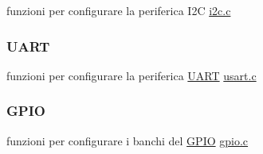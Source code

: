 \begin{DoxyItemize}
\item funzioni per configurare la periferica I2C \hyperlink{i2c_8c}{i2c.\+c} 
\end{DoxyItemize}\hypertarget{index_UART}{}\subsubsection{U\+A\+RT}\label{index_UART}

\begin{DoxyItemize}
\item funzioni per configurare la periferica \hyperlink{structUART}{U\+A\+RT} \hyperlink{usart_8c}{usart.\+c} 
\end{DoxyItemize}\hypertarget{index_GPIO}{}\subsubsection{G\+P\+IO}\label{index_GPIO}

\begin{DoxyItemize}
\item funzioni per configurare i banchi del \hyperlink{structGPIO}{G\+P\+IO} \hyperlink{gpio_8c}{gpio.\+c} 
\end{DoxyItemize}